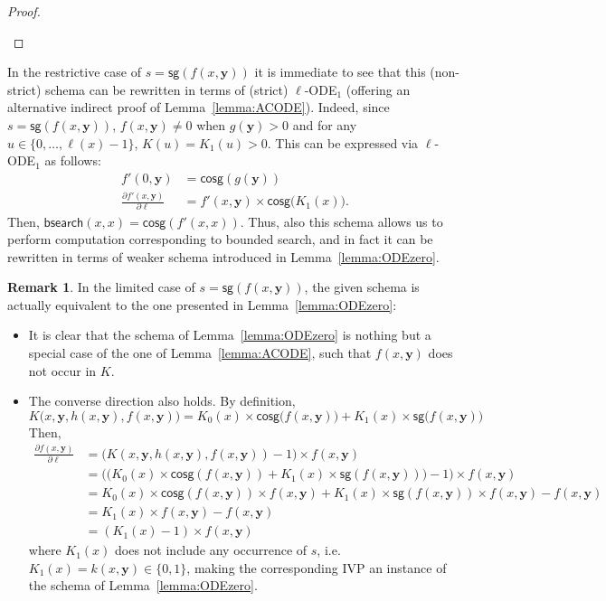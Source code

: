\documentclass[11pt, oneside]{article}
\newcommand{\fun}[1]{\mathsf{#1}}
\newcommand{\tu}[1]{\mathbf{#1}}
\theoremstyle{definition}
\newtheorem{remark}{Remark}
\begin{document}
\begin{toappendix}
\begin{proof}
\begin{itemize}
    \end{itemize}
\end{proof}
%
In the restrictive case of $s=\fun{sg}(f(x, \tu y))$ it is immediate to see that this (non-strict) schema can be rewritten in terms of (strict) $\ell$-ODE$_1$ (offering an alternative indirect proof of Lemma~\ref{lemma:ACODE}).
%
Indeed, since $s=\fun{sg}(f(x, \tu y))$, $f(x, \tu y) \neq 0$ when $g(\tu y)>0$ and for any $u\in \{0, \dots, \ell(x)-1\}$, $K(u)=K_1(u)>0$.
%
This can be expressed via $\ell$-ODE$_1$ as follows:
\begin{align*}
    f'(0, \tu y) &= \fun{cosg}(g(\tu y)) \\
    \frac{\partial f'(x, \tu y)}{\partial \ell} &= f'(x, \tu y) \times \fun{cosg}\big(K_1(x)\big).
\end{align*}
Then, $\fun{bsearch}(x,x)=\fun{cosg}(f'(x,x))$.
%
Thus, also this schema allows us to perform computation corresponding to bounded search, and in fact it can be rewritten in terms of weaker schema introduced in Lemma~\ref{lemma:ODEzero}.

\begin{remark} %
In the limited case of $s=\fun{sg}(f(x,\tu y))$, the given schema is actually equivalent to the one presented in Lemma~\ref{lemma:ODEzero}:
\begin{itemize}
    \itemsep0em
    \item It is clear that the schema of Lemma~\ref{lemma:ODEzero} is nothing but a special case of the one of Lemma~\ref{lemma:ACODE}, such that $f(x, \tu y)$ does not occur in $K$.
    \item The converse direction also holds.
    By definition, 
    $$
    K\big(x, \tu y, h(x, \tu y), f(x, \tu y)\big) = K_0(x) \times \fun{cosg}\big(f(x, \tu y)\big) + K_1(x) \times \fun{sg}\big(f(x, \tu y)\big) 
    $$
    Then,
    \begin{align*}
        \frac{\partial f(x,\tu y)}{\partial \ell} &= \big(K(x, \tu y, h(x, \tu y), f(x, \tu y)) - 1\big) \times f(x, \tu y) \\
        &= \big(\big(K_0(x) \times \fun{cosg}(f(x, \tu y)) + K_1(x) \times \fun{sg}(f(x,\tu y))\big)-1\big) \times f(x, \tu y) \\
        &= K_0(x) \times \fun{cosg}(f(x, \tu y)) \times f(x, \tu y) + K_1(x) \times \fun{sg}(f(x, \tu y))\times f(x, \tu y) - f(x, \tu y)
        \\
        &= K_1(x) \times f(x, \tu y) - f(x, \tu y) \\
        &= (K_1(x)-1) \times f(x, \tu y)
    \end{align*}
    where $K_1(x)$ does not include any occurrence of $s$, i.e. $K_1(x) = k(x, \tu y) \in \{0,1\}$, making the corresponding IVP an instance of the schema of Lemma~\ref{lemma:ODEzero}.
\end{itemize}
\end{remark}
\end{toappendix}
\end{document}
